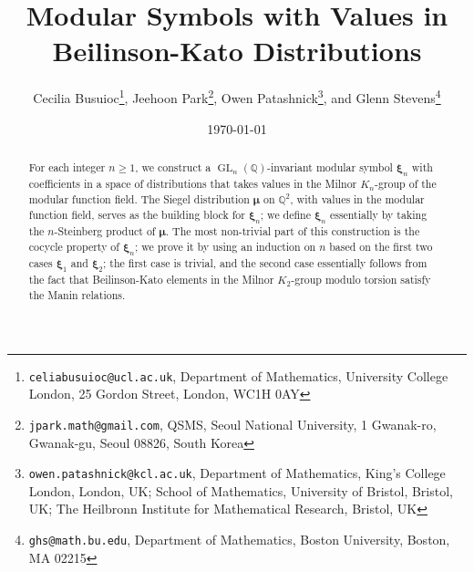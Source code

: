 \documentclass[12pt,amstex,amssymb]{article}
\theoremstyle{plain}
\theoremstyle{definition}
\def\Q{{\mathbb Q}}
\newcommand{\GL}{\operatorname{GL}}
\begin{document}
\title{Modular Symbols with Values in Beilinson-Kato Distributions}

\author{Cecilia Busuioc\footnote{\texttt{celiabusuioc@ucl.ac.uk}, Department of Mathematics, 
University College London, 
25 Gordon Street, London, WC1H 0AY}, Jeehoon Park\footnote{ \texttt{jpark.math@gmail.com}, QSMS, Seoul National University, 1 Gwanak-ro, Gwanak-gu, Seoul 08826, South Korea}, Owen Patashnick\footnote{ \texttt{owen.patashnick@kcl.ac.uk}, Department of Mathematics, King's College London, London, UK; School of Mathematics, University of Bristol, Bristol, UK; The Heilbronn Institute for Mathematical Research, Bristol, UK}, and Glenn Stevens\footnote{ \texttt{ghs@math.bu.edu}, Department of Mathematics, Boston University, Boston, MA 02215}}

\date{\today}

\maketitle
\begin{abstract}
		For each integer $n\geq 1$, we construct a $\GL_n(\Q)$-invariant modular symbol $\bm\xi_n$ with coefficients in a space of distributions that takes values in the Milnor $K_n$-group of the modular function field.
	The Siegel distribution $\bm\mu$ on $\Q^2$, with values in the modular function field, serves as the building block for $\bm\xi_n$; we define $\bm\xi_n$ essentially by taking the $n$-Steinberg product of $\bm\mu$.  
	The most non-trivial part of this construction is the cocycle property of $\bm\xi_n$; we prove it by using an induction on $n$ based on the first two cases $\bm\xi_1$ and $\bm\xi_2$; the first case is trivial, and the second case essentially follows from the fact that Beilinson-Kato elements in the Milnor $K_2$-group modulo torsion satisfy the Manin relations. 
	
	
	
\end{abstract}
\end{document}
